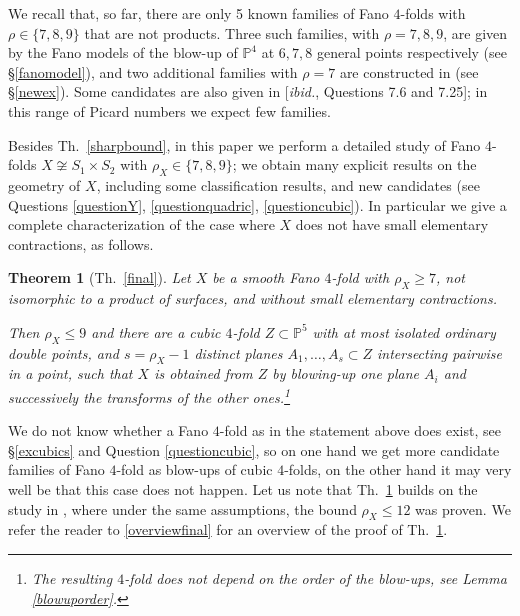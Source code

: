 \documentclass[a4paper,12pt]{amsart}
\newtheorem{thm}{Theorem}[section]
\theoremstyle{definition}
\numberwithin{figure}{section}
\numberwithin{table}{section}
\newcommand{\pr}{\mathbb{P}}
\begin{document}
We recall that, so far, there are only 5 known families of Fano $4$-folds with $\rho\in\{7,8,9\}$ that are not products. Three such families, with $\rho=7,8,9$, are given by the Fano models of the blow-up of $\pr^4$ at $6,7,8$ general points respectively (see \S\ref{fanomodel}), and two additional families with $\rho=7$ are constructed in \cite[Prop.~1.9]{3folds} (see \S\ref{newex}). Some candidates are also given in [\emph{ibid.}, Questions 7.6 and 7.25];
in this range of Picard numbers  we expect few families.

Besides Th.~\ref{sharpbound}, in this paper we perform a detailed study of Fano $4$-folds $X\not\cong S_1\times S_2$ with $\rho_X\in\{7,8,9\}$; we obtain many explicit results on the geometry of $X$, including some classification results, and new candidates (see Questions \ref{questionY}, \ref{questionquadric}, \ref{questioncubic}).
In particular we give a complete characterization of the case where $X$ does not have small elementary contractions, as follows.
\begin{thm}[Th.~\ref{final}]\label{finalintro}
         Let $X$ be a smooth Fano $4$-fold with $\rho_X\geq 7$, not isomorphic to a product of surfaces, and without small elementary contractions.
             
             Then $\rho_X\leq 9$ and there are a cubic $4$-fold $Z\subset \pr^5$ with at most isolated ordinary double points, and $s=\rho_X-1$ distinct planes  $A_1,\dotsc,A_s\subset Z$ intersecting pairwise in a point, such that $X$ is obtained from $Z$ by blowing-up one plane $A_i$ and successively the transforms of the other ones.\footnote{The resulting $4$-fold does not depend on the order of the blow-ups, see Lemma \ref{blowuporder}.} 
     \end{thm}
     We do not know whether a Fano $4$-fold as in the statement above does exist, see \S\ref{excubics} and Question \ref{questioncubic}, so on one hand we get more candidate families of Fano $4$-fold as blow-ups of cubic $4$-folds, on the other hand it may very well be that this case does not happen. Let us note that Th.~\ref{finalintro} builds on the study in \cite{32}, where under the same assumptions, the bound $\rho_X\leq 12$ was proven. We refer the reader to \ref{overviewfinal} for an overview of the proof of Th.~\ref{finalintro}.
     
\medskip
     
\end{document}
